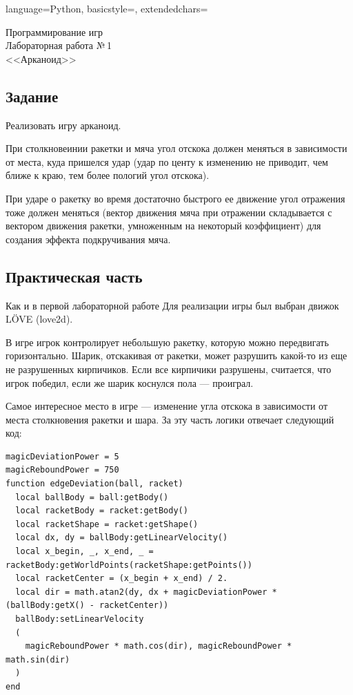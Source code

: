 \documentclass[12pt]{article}
\newcommand{\StudentName}{Ильвохин Дмитрий}
\newcommand{\Group}{1O-106М}
\newcommand{\CourseName}{Программирование игр}
\newcommand{\LabNum}{1}
\newcommand{\Subject}{Арканоид}
\begin{document}

\lstset
{
        language=Python,
        basicstyle=\footnotesize,%
        extendedchars=\true
}

\begin{flushright}
\Large{
	\CourseName \\
	Лабораторная работа №\,\LabNum \\
	<<\Subject>> \\
}
\end{flushright}

\subsection*{Задание}
Реализовать игру арканоид.

При столкновеинии ракетки и мяча угол отскока должен меняться в зависимости от места,
куда пришелся удар (удар по центу к изменению не приводит, чем ближе к краю,
тем более пологий угол отскока).

При ударе о ракетку во время достаточно быстрого ее движение угол отражения тоже должен меняться
(вектор движения мяча при отражении складывается с вектором движения ракетки, 
умноженным на некоторый коэффициент) для создания эффекта подкручивания мяча.

\subsection*{Практическая часть}
Как и в первой лабораторной работе Для реализации игры был выбран движок LÖVE (love2d).

В игре игрок контролирует небольшую ракетку, которую можно передвигать горизонтально.
Шарик, отскакивая от ракетки, может разрушить какой-то из еще не разрушенных кирпичиков.
Если все кирпичики разрушены, считается, что игрок победил, если же шарик коснулся пола ---
проиграл.

Самое интересное место в игре --- изменение угла отскока в зависимости от места
столкновения ракетки и шара. За эту часть логики отвечает следующий код:

\begin{lstlisting}
magicDeviationPower = 5
magicReboundPower = 750
function edgeDeviation(ball, racket)
  local ballBody = ball:getBody()
  local racketBody = racket:getBody()
  local racketShape = racket:getShape()
  local dx, dy = ballBody:getLinearVelocity()
  local x_begin, _, x_end, _ = racketBody:getWorldPoints(racketShape:getPoints())
  local racketCenter = (x_begin + x_end) / 2.
  local dir = math.atan2(dy, dx + magicDeviationPower * (ballBody:getX() - racketCenter))
  ballBody:setLinearVelocity
  (
    magicReboundPower * math.cos(dir), magicReboundPower * math.sin(dir)
  )
end
\end{lstlisting}
\end{document}
